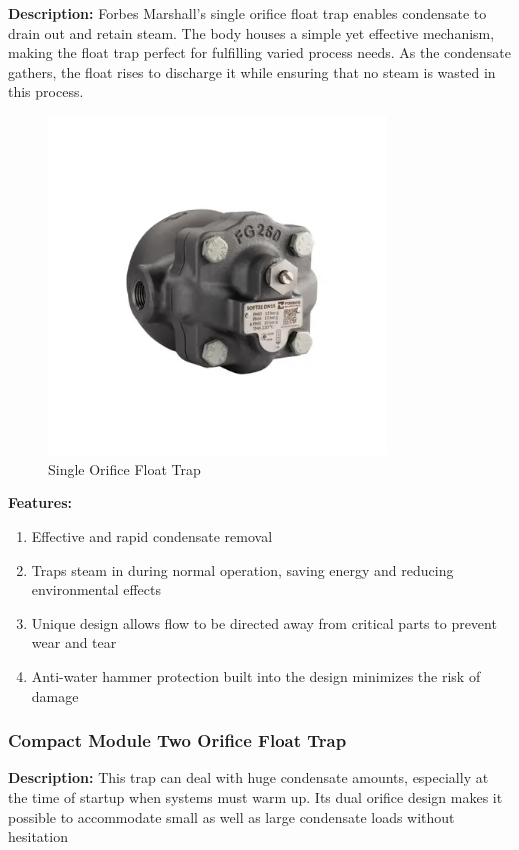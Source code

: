 \textbf{Description:} Forbes Marshall's single orifice float trap enables condensate to drain out and retain steam. The body houses a simple yet effective mechanism, making the float trap perfect for fulfilling varied process needs. As the condensate gathers, the float rises to discharge it while ensuring that no steam is wasted in this process.
\begin{figure}[h]
    \centering
    \includegraphics[width=0.8\textwidth,height=0.33\textheight,keepaspectratio]{figs/lastmin/Single Orifice Ball Float Trap.png}
    \caption{Single Orifice Float Trap}
    \label{fig:single_orifice_float_trap}
\end{figure}

\textbf{Features:}
\begin{enumerate}
    \item Effective and rapid condensate removal
    \item Traps steam in during normal operation, saving energy and reducing environmental effects
    \item Unique design allows flow to be directed away from critical parts to prevent wear and tear
    \item Anti-water hammer protection built into the design minimizes the risk of damage
\end{enumerate}

\subsubsection{Compact Module Two Orifice Float Trap}
\textbf{Description:}  This trap can deal with huge condensate amounts, especially at the time of startup when systems must warm up. Its dual orifice design makes it possible to accommodate small as well as large condensate loads without hesitation

